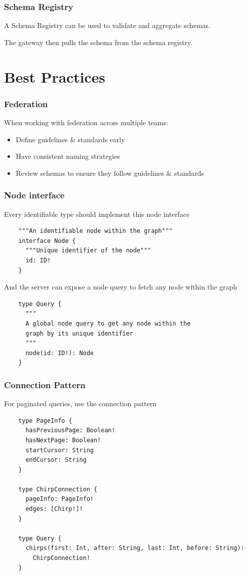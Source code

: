 \documentclass{beamer}
\begin{document}
\begin{frame}
  \frametitle{Schema Registry}
  A Schema Registry can be used to validate and aggregate schemas.

  \vspace{1em}
  The gateway then pulls the schema from the schema registry.
\end{frame}


\section{Best Practices}
\begin{frame}
  \frametitle{Federation}
  When working with federation across multiple teams:
  \begin{itemize}
  \item Define guidelines \& standards early
  \item Have consistent naming strategies
  \item Review schemas to ensure they follow guidelines \& standards
  \end{itemize}
\end{frame}


\begin{frame}[fragile]
  \frametitle{Node interface}
  Every identifiable type should implement this node interface
  \begin{verbatim}
    """An identifiable node within the graph"""
    interface Node {
      """Unique identifier of the node"""
      id: ID!
    }
  \end{verbatim}

  And the server can expose a node query to fetch any node within the graph
  \begin{verbatim}
    type Query {
      """
      A global node query to get any node within the
      graph by its unique identifier
      """
      node(id: ID!): Node
    }
  \end{verbatim}
\end{frame}


\begin{frame}[fragile]
  \frametitle{Connection Pattern}
  For paginated queries, use the connection pattern\cite{Connection-Spec}

  \begin{verbatim}
    type PageInfo {
      hasPreviousPage: Boolean!
      hasNextPage: Boolean!
      startCursor: String
      endCursor: String
    }

    type ChirpConnection {
      pageInfo: PageInfo!
      edges: [Chirp!]!
    }

    type Query {
      chirps(first: Int, after: String, last: Int, before: String):
        ChirpConnection!
    }
  \end{verbatim}
\end{frame}
\end{document}
